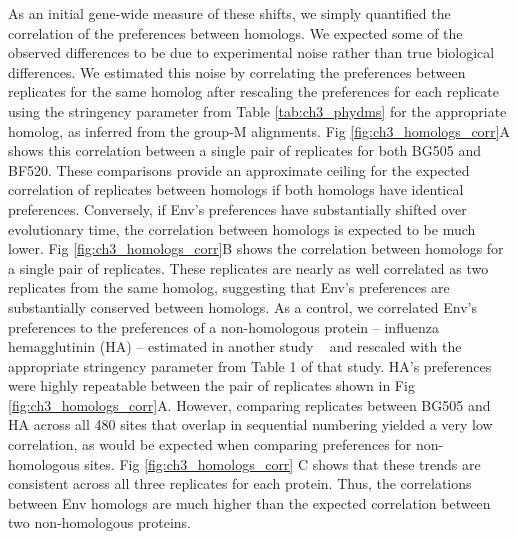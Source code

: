 \documentclass[9pt]{elife}
\begin{document}
As an initial gene-wide measure of these shifts, we simply quantified the correlation of the preferences between homologs.
We expected some of the observed differences to be due to experimental noise rather than true biological differences.
We estimated this noise by correlating the preferences between replicates for the same homolog after rescaling the preferences for each replicate using the stringency parameter from Table \ref{tab:ch3_phydms} for the appropriate homolog, as inferred from the group-M alignments.
Fig \ref{fig:ch3_homologs_corr}A shows this correlation between a single pair of replicates for both BG505 and BF520.
These comparisons provide an approximate ceiling for the expected correlation of replicates between homologs if both homologs have identical preferences.
Conversely, if Env's preferences have substantially shifted over evolutionary time, the correlation between homologs is expected to be much lower.
Fig \ref{fig:ch3_homologs_corr}B shows the correlation between homologs for a single pair of replicates.
These replicates are nearly as well correlated as two replicates from the same homolog, suggesting that Env's preferences are substantially conserved between homologs.
As a control, we correlated Env's preferences to the preferences of a non-homologous protein -- influenza hemagglutinin (HA) -- estimated in another study ~\cite{doud2016accurate} and rescaled with the appropriate stringency parameter from Table 1 of that study.
HA's preferences were highly repeatable between the pair of replicates shown in Fig \ref{fig:ch3_homologs_corr}A.
However, comparing replicates between BG505 and HA across all 480 sites that overlap in sequential numbering yielded a very low correlation, as would be expected when comparing preferences for non-homologous sites.
Fig \ref{fig:ch3_homologs_corr} C shows that these trends are consistent across all three replicates for each protein.
Thus, the correlations between Env homologs are much higher than the expected correlation between two non-homologous proteins.
\end{document}
